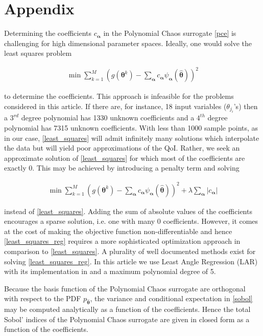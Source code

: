 \section*{Appendix}

Determining the coefficients $c_{\boldsymbol{\alpha}}$ in the Polynomial Chaos surrogate \eqref{pce} is challenging for high dimensional parameter spaces. Ideally, one would solve the least squares problem
\begin{ceqn}
\begin{eqnarray}
\label{least_squares}
\min \sum\limits_{k=1}^M \left(g(\boldsymbol{\theta}^k)-\sum_{\boldsymbol{\alpha}} c_{\boldsymbol{\alpha}} \psi_{\boldsymbol{\alpha}}(\hat{\boldsymbol{\theta}}) \right)^2 \tag{A.1}
\end{eqnarray}
\end{ceqn}
to determine the coefficients. This approach is infeasible for the problems considered in this article. If there are, for instance, 18 input variables ($\theta_{j_i}$'s) then a $3^{rd}$ degree polynomial has 1330 unknown coefficients and a $4^{th}$ degree polynomial has 7315 unknown coefficients. With less than 1000 sample points, as in our case, \eqref{least_squares} will admit infinitely many solutions which interpolate the data but will yield poor approximations of the QoI. Rather, we seek an approximate solution of \eqref{least_squares} for which most of the coefficients are exactly 0. This may be achieved by introducing a penalty term and solving
\begin{ceqn}
\begin{eqnarray}
\label{least_squares_reg}
\min \sum\limits_{k=1}^M \left(g(\boldsymbol{\theta}^k)-\sum_{\boldsymbol{\alpha}} c_{\boldsymbol{\alpha}} \psi_{\boldsymbol{\alpha}}(\hat{\boldsymbol{\theta}}) \right)^2 + \lambda \sum_{\boldsymbol{\alpha}} \vert c_{\boldsymbol{\alpha}} \vert \tag{A.2}
\end{eqnarray}
\end{ceqn}
instead of \eqref{least_squares}. Adding the sum of absolute values of the coefficients encourages a sparse solution, i.e. one with many 0 coefficients. However, it comes at the cost of making the objective function non-differentiable and hence \eqref{least_squares_reg} requires a more sophisticated optimization approach in comparison to \eqref{least_squares}. A plurality of well documented methods exist for solving \eqref{least_squares_reg}. In this article we use Least Angle Regression (LAR) \cite{lar} with its implementation in \cite{uqlab} and a maximum polynomial degree of 5.

Because the basis function of the Polynomial Chaos surrogate are orthogonal with respect to the PDF $p_{\hat{\boldsymbol{\theta}}}$, the variance and conditional expectation in \eqref{sobol} may be computed analytically as a function of the coefficients. Hence the total Sobol' indices of the Polynomial Chaos surrogate are given in closed form as a function of the coefficients.